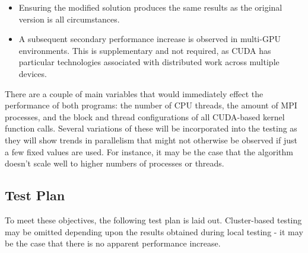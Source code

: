 \documentclass[conference]{IEEEtran}
\begin{document}
\begin{itemize}
    \item Ensuring the modified solution produces the same results as the original version is all circumstances.
    \item A subsequent secondary performance increase is observed in multi-GPU environments. This is supplementary and not required, as CUDA has particular technologies associated with distributed work across multiple devices.   
\end{itemize}

There are a couple of main variables that would immediately effect the performance of both programs: the number of CPU threads, the amount of MPI processes, and the block and thread configurations of all CUDA-based kernel function calls. Several variations of these will be incorporated into the testing as they will show trends in parallelism that might not otherwise be observed if just a few fixed values are used. For instance, it may be the case that the algorithm doesn't scale well to higher numbers of processes or threads.

\subsection{Test Plan}
\label{subsec:testplan}

To meet these objectives, the following test plan is laid out. Cluster-based testing may be omitted depending upon the results obtained during local testing - it may be the case that there is no apparent performance increase.
\end{document}

